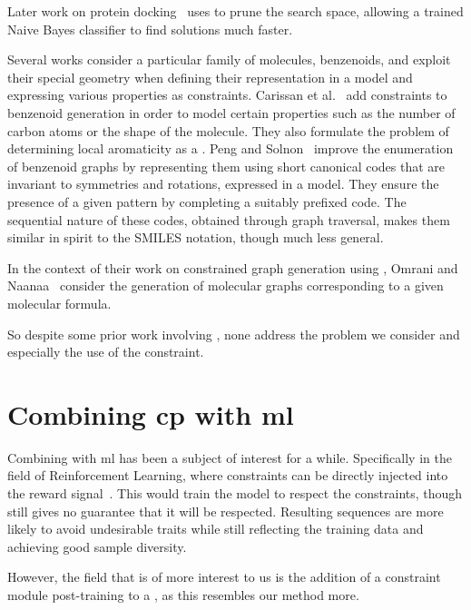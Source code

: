 \documentclass[../Document.tex]{subfiles}
\begin{document}
Later work on protein docking~\cite{DBLP:journals/almob/KrippahlB15} uses \cp to prune the search space, allowing a trained Naive Bayes classifier to find solutions much faster.

Several works consider a particular family of molecules, benzenoids, and exploit their special geometry when defining their representation in a \cp model and expressing various properties as constraints.
Carissan et al.~\cite{DBLP:journals/constraints/CarissanHPTV22,DBLP:journals/jcisd/VaretPTHC22} add constraints to benzenoid generation in order to model certain properties such as the number of carbon atoms or the shape of the molecule.
They also formulate the problem of determining local aromaticity as a \csp.
Peng and Solnon~\cite{DBLP:conf/cp/PengS23} improve the enumeration of benzenoid graphs by representing them using short canonical codes that are invariant to symmetries and rotations, expressed in a \cp model.
They ensure the presence of a given pattern by completing a suitably prefixed code.
The sequential nature of these codes, obtained through graph traversal, makes them similar in spirit to the SMILES notation, though much less general.

In the context of their work on constrained graph generation using \cp, Omrani and\\ Naanaa~\cite{DBLP:journals/constraints/OmraniN20} consider the generation of molecular graphs corresponding to a given molecular formula.

So despite some prior work involving \cp, none address the problem we consider and especially the use of the \grammar constraint.


\section{Combining \acrshort{cp} with \acrshort{ml}}
\label{sec:lit-review/gpt+cp}
Combining \cp with \gls{ml} has been a subject of interest for a while.
Specifically in the field of Reinforcement Learning, where constraints can be directly injected into the reward signal~\cite{DBLP:conf/cp/LafleurCP22,DBLP:conf/cpaior/YinCP24}.
This would train the model to respect the constraints, though still gives no guarantee that it will be respected.
Resulting sequences are more likely to avoid undesirable traits while still reflecting the training data and achieving good sample diversity.

However, the field that is of more interest to us is the addition of a constraint module post-training to a \nn, as this resembles our method more.
\end{document}
